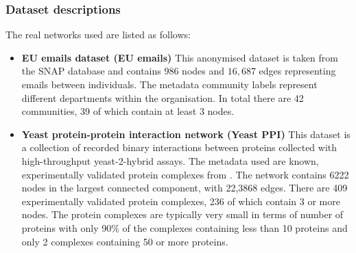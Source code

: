 \documentclass[a4paper,10pt]{article}
\begin{document}
\subsubsection{Dataset descriptions}
\label{sec:real_network_descs}
The real networks used are listed as follows:
\begin{itemize}
 \item \textbf{EU emails dataset (EU emails)} This anonymised dataset is taken from the SNAP database \cite{snap} and contains $986$ nodes and $16,687$ edges representing emails between individuals.
 The metadata community labels represent different departments within the organisation.
 In total there are 42 communities, 39 of which contain at least 3 nodes.
 
 \item \textbf{Yeast protein-protein interaction network (Yeast PPI)} \cite{yeast_ppi}
 This dataset is a collection of recorded binary interactions between proteins collected with high-throughput yeast-2-hybrid assays.
 The metadata used are known, experimentally validated protein complexes from \cite{yeast_ppi_complexes}.
 The network contains 6222 nodes in the largest connected component, with 22,3868 edges.
 There are 409 experimentally validated protein complexes, 236 of which contain 3 or more nodes.
 The protein complexes are typically very small in terms of number of proteins with only 90\% of the complexes containing less than 10 proteins and only 2 complexes containing 50 or more proteins.
 
\end{itemize}
\end{document}
